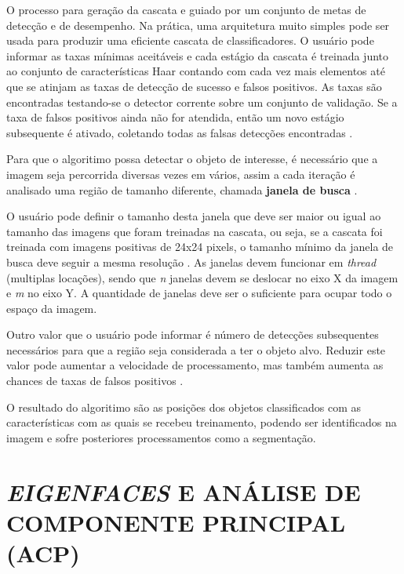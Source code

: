 O processo para geração da cascata e guiado por um conjunto de metas de detecção e de desempenho. Na prática, uma arquitetura muito simples pode ser usada para produzir uma eficiente cascata de classificadores. O usuário pode informar as taxas mínimas aceitáveis e cada estágio da cascata é treinada junto ao conjunto de características Haar contando com cada vez mais elementos até que se atinjam as taxas de detecção de sucesso e falsos positivos. As taxas são encontradas testando-se o detector corrente sobre um conjunto de validação. Se a taxa de falsos positivos ainda não for atendida, então um novo estágio subsequente é ativado, coletando todas as falsas detecções encontradas \cite{gustavo_cascata}.

Para que o algoritimo possa detectar o objeto de interesse, é necessário que a imagem seja percorrida diversas vezes em vários, assim a cada iteração é analisado uma região de tamanho diferente, chamada \textbf{janela de busca} \cite{gustavo_cascata}. 

O usuário pode definir o tamanho desta janela que deve ser maior ou igual ao tamanho das imagens que foram treinadas na cascata, ou seja, se a cascata foi treinada com imagens positivas de 24x24 pixels, o tamanho mínimo da janela de busca deve seguir a mesma resolução \cite{gustavo_cascata}. As janelas devem funcionar em \textit{thread} (multiplas locações), sendo que \textit{n} janelas devem se deslocar no eixo X da imagem e \textit{m} no eixo Y. A quantidade de janelas deve ser o suficiente para ocupar todo o espaço da imagem.

Outro valor que o usuário pode informar é número de detecções subsequentes necessários para que a região seja considerada a ter o objeto alvo. Reduzir este valor pode aumentar a velocidade de processamento, mas também aumenta as chances de taxas de falsos positivos \cite{drmathew_java_programming}.

O resultado do algoritimo são as posições dos objetos classificados com as características com as quais se recebeu treinamento, podendo ser identificados na imagem e sofre posteriores processamentos como a segmentação.




\section{\textit{EIGENFACES} E ANÁLISE DE COMPONENTE PRINCIPAL (ACP) }\label{sec:recog_faces}

